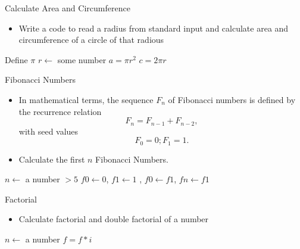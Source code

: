 \documentclass[10pt,t]{beamer}
\begin{document}
\begin{frame}{Calculate Area and Circumference}
  \begin{itemize}
  \item Write a code to read a radius from standard input and calculate area and circumference of a circle of that radious
  \end{itemize}
  \begin{algorithm}[H]
    \caption{Pseudo code for calculating area and circumference} 
    \begin{algorithmic}
      \State Define $\pi$
      \State $r \gets$ some number
      \State $a = \pi{}r^2$
      \State $c = 2\pi{}r$
    \end{algorithmic}
  \end{algorithm}
\end{frame}

\begin{frame}{Fibonacci Numbers}
  \begin{itemize}
  \item In mathematical terms, the sequence $F_n$ of Fibonacci numbers is defined by the recurrence relation
    \begin{equation*}
      F_n = F_{n-1} + F_{n-2},
    \end{equation*}
    with seed values
    \begin{equation*}
      F_0 = 0 ;  F_1 = 1.
    \end{equation*}
  \item Calculate the first $n$ Fibonacci Numbers.
  \end{itemize}
  \begin{algorithm}[H]
    \caption{Pseudo Code to calculate sequence of Fibinacci Numbers}
    \begin{algorithmic}
      \State $n \gets$ a number $> 5$
      \State $f0 \gets 0$, $f1 \gets 1$
      , {$f0 \gets f1$}, {$fn \gets f1$}
      \EndDo
    \end{algorithmic}
  \end{algorithm}
\end{frame}

\begin{frame}{Factorial}
  \begin{itemize}
  \item Calculate factorial and double factorial of a number
  \end{itemize}
  \begin{algorithm}[H]
    \caption{Pseudo Code for Factorial}
    \begin{algorithmic}
      \State $n \gets$ a number
      \State $f = f * i$
      \EndDo
    \end{algorithmic}
  \end{algorithm}
\end{frame}
  
\end{document}
